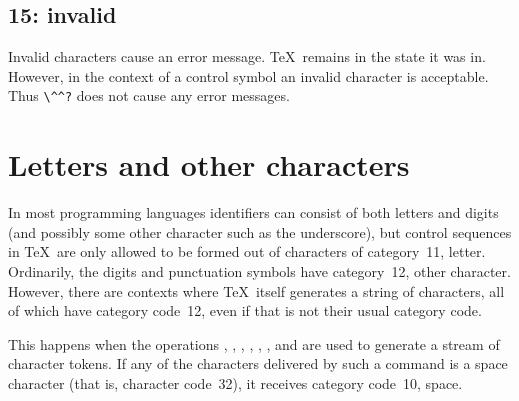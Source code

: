 \documentclass{book}
\begin{document}
\subsection{15: invalid}

Invalid characters cause an error message. \TeX\ remains in
the state it was in.
However, in the context of a control symbol an invalid character
is acceptable. Thus \verb>\^^?> does not cause any error messages.

\section{Letters and other characters}
\label{cat12}

In most programming languages identifiers can consist
of both letters and digits (and possibly some other
character such as the underscore), but control sequences in \TeX\
are only allowed to be formed out of characters of category~11,
letter. Ordinarily, the digits and punctuation symbols have
category~12, other character.
However, there are contexts where \TeX\ itself
generates a string of characters, all of which have
category code~12, even if that is not their usual
category code.

This happens when the operations 
,
,
,
,
,
,
and 
are used to generate a stream of character tokens.
If any of the characters delivered by such a command
is a space character (that is, character code~32), 
it receives category code~10, space.
\end{document}
